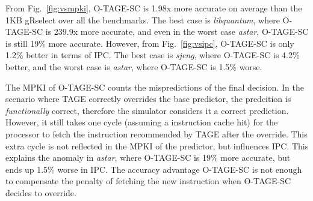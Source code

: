 From Fig.~\ref{fig:vsmpki}, \mbox{O-TAGE-SC} is 1.98x more accurate on average than the 1KB gRselect over all the benchmarks. The best case is \textit{libquantum}, where \mbox{O-TAGE-SC} is 239.9x more accurate, and even in the worst case \textit{astar}, \mbox{O-TAGE-SC} is still 19\% more accurate. However, from Fig.~\ref{fig:vsipc}, \mbox{O-TAGE-SC} is only 1.2\% better in terms of IPC. The best case is \textit{sjeng}, where \mbox{O-TAGE-SC} is 4.2\% better, and the worst case is \textit{astar}, where \mbox{O-TAGE-SC} is 1.5\% worse.

The MPKI of \mbox{O-TAGE-SC} counts the mispredictions of the final decision. In the scenario where TAGE correctly overrides the base predictor, the predcition is \textit{functionally} correct, therefore the simulator considers it a correct prediction. However, it still takes one cycle (assuming a instruction cache hit) for the processor to fetch the instruction recommended by TAGE after the override. This extra cycle is not reflected in the MPKI of the predictor, but influences IPC. This explains the anomaly in \textit{astar}, where \mbox{O-TAGE-SC} is 19\% more accurate, but ends up 1.5\% worse in IPC. The accuracy advantage \mbox{O-TAGE-SC} is not enough to compensate the penalty of fetching the new instruction when \mbox{O-TAGE-SC} decides to override.












